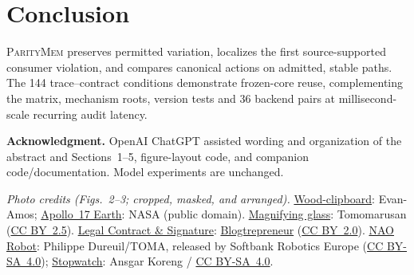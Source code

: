 \documentclass[letterpaper]{article}
\newcommand{\system}{\textsc{ParityMem}\xspace}
\begin{document}
\section{Conclusion}
\system preserves permitted variation, localizes the first source-supported
consumer violation, and compares canonical actions on admitted, stable paths.
The 144 trace--contract conditions demonstrate frozen-core reuse,
complementing the matrix, mechanism roots, version tests and 36 backend pairs
at millisecond-scale recurring audit latency.


\par\smallskip
\noindent\textbf{Acknowledgment.} OpenAI ChatGPT assisted wording and
organization of the abstract and Sections~1--5, figure-layout code, and
companion code/documentation. Model experiments are unchanged.

\par\smallskip
\noindent\textit{Photo credits (Figs.~2--3; cropped, masked, and arranged).}
\href{https://commons.wikimedia.org/wiki/File:Wood-clipboard.jpg}{Wood-clipboard}:
Evan-Amos; \href{https://commons.wikimedia.org/wiki/File:The_Earth_seen_from_Apollo_17.jpg}{Apollo~17 Earth}:
NASA (public domain).
\href{https://commons.wikimedia.org/wiki/File:Magnifying_glass.jpg}{Magnifying glass}:
Tomomarusan (\href{https://creativecommons.org/licenses/by/2.5/}{CC BY~2.5}).
\href{https://commons.wikimedia.org/wiki/File:Legal_Contract_\%26_Signature_-_Warm_Tones.jpg}{Legal Contract \& Signature}:
\href{https://howtostartablogonline.net/legal/}{Blogtrepreneur}
(\href{https://creativecommons.org/licenses/by/2.0/}{CC BY~2.0}).
\href{https://commons.wikimedia.org/wiki/File:NAO_Robot_.jpg}{NAO Robot}:
Philippe Dureuil/TOMA, released by Softbank Robotics Europe
(\href{https://creativecommons.org/licenses/by-sa/4.0/}{CC BY-SA~4.0});
\href{https://commons.wikimedia.org/wiki/File:Stopwatch,_1810201155,_ako.jpg}{Stopwatch}:
Ansgar Koreng / \href{https://creativecommons.org/licenses/by-sa/4.0/}{CC BY-SA~4.0}.

\clearpage
\emergencystretch=30pt


\end{document}
